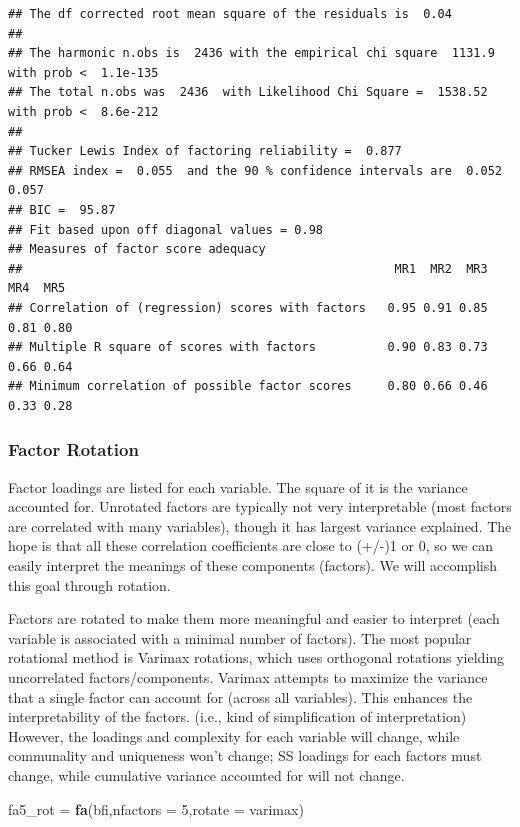 \documentclass[
]{ctexart}
\newenvironment{Shaded}{\begin{snugshade}}{\end{snugshade}}
\newcommand{\AttributeTok}[1]{\textcolor[rgb]{0.13,0.29,0.53}{#1}}
\newcommand{\DecValTok}[1]{\textcolor[rgb]{0.00,0.00,0.81}{#1}}
\newcommand{\FunctionTok}[1]{\textcolor[rgb]{0.13,0.29,0.53}{\textbf{#1}}}
\newcommand{\NormalTok}[1]{#1}
\newcommand{\OtherTok}[1]{\textcolor[rgb]{0.56,0.35,0.01}{#1}}
\newcommand{\StringTok}[1]{\textcolor[rgb]{0.31,0.60,0.02}{#1}}
\begin{document}
\begin{verbatim}
## The df corrected root mean square of the residuals is  0.04 
## 
## The harmonic n.obs is  2436 with the empirical chi square  1131.9  with prob <  1.1e-135 
## The total n.obs was  2436  with Likelihood Chi Square =  1538.52  with prob <  8.6e-212 
## 
## Tucker Lewis Index of factoring reliability =  0.877
## RMSEA index =  0.055  and the 90 % confidence intervals are  0.052 0.057
## BIC =  95.87
## Fit based upon off diagonal values = 0.98
## Measures of factor score adequacy             
##                                                    MR1  MR2  MR3  MR4  MR5
## Correlation of (regression) scores with factors   0.95 0.91 0.85 0.81 0.80
## Multiple R square of scores with factors          0.90 0.83 0.73 0.66 0.64
## Minimum correlation of possible factor scores     0.80 0.66 0.46 0.33 0.28
\end{verbatim}

\hypertarget{factor-rotation}{%
\subsubsection{Factor Rotation}\label{factor-rotation}}

Factor loadings are listed for each variable. The square of it is the
variance accounted for. Unrotated factors are typically not very
interpretable (most factors are correlated with many variables), though
it has largest variance explained. The hope is that all these
correlation coefficients are close to (+/-)1 or 0, so we can easily
interpret the meanings of these components (factors). We will accomplish
this goal through rotation.

Factors are rotated to make them more meaningful and easier to interpret
(each variable is associated with a minimal number of factors). The most
popular rotational method is Varimax rotations, which uses orthogonal
rotations yielding uncorrelated factors/components. Varimax attempts to
maximize the variance that a single factor can account for (across all
variables). This enhances the interpretability of the factors. (i.e.,
kind of simplification of interpretation) However, the loadings and
complexity for each variable will change, while communality and
uniqueness won't change; SS loadings for each factors must change, while
cumulative variance accounted for will not change.

\begin{Shaded}
\begin{Highlighting}[]
\NormalTok{fa5\_rot }\OtherTok{=} \FunctionTok{fa}\NormalTok{(bfi,}\AttributeTok{nfactors =} \DecValTok{5}\NormalTok{,}\AttributeTok{rotate =} \StringTok{\textquotesingle{}varimax\textquotesingle{}}\NormalTok{)}
\end{Highlighting}
\end{Shaded}
\end{document}

